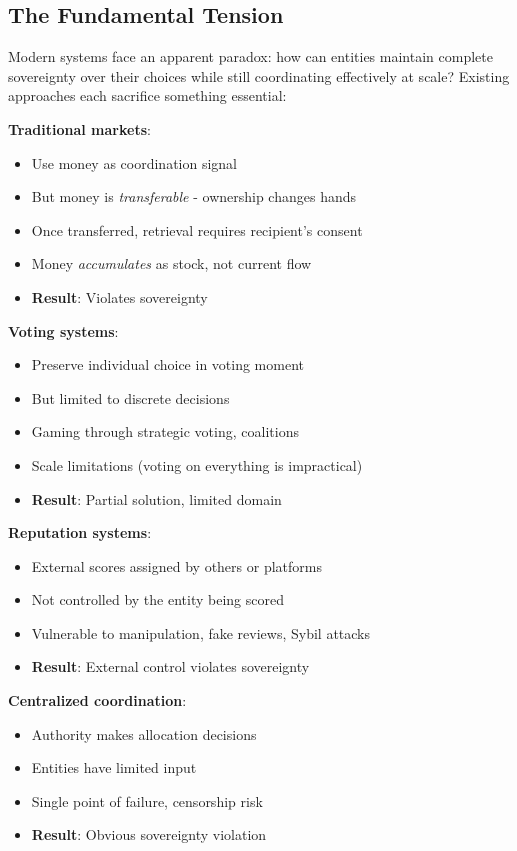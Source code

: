 \documentclass[11pt,a4paper]{article}
\theoremstyle{definition}
\theoremstyle{remark}
\begin{document}
\subsection{The Fundamental Tension}

Modern systems face an apparent paradox: how can entities maintain complete sovereignty over their choices while still coordinating effectively at scale? Existing approaches each sacrifice something essential:

\textbf{Traditional markets}:
\begin{itemize}
\item Use money as coordination signal
\item But money is \textit{transferable} - ownership changes hands
\item Once transferred, retrieval requires recipient's consent
\item Money \textit{accumulates} as stock, not current flow
\item \textbf{Result}: Violates sovereignty
\end{itemize}

\textbf{Voting systems}:
\begin{itemize}
\item Preserve individual choice in voting moment
\item But limited to discrete decisions
\item Gaming through strategic voting, coalitions
\item Scale limitations (voting on everything is impractical)
\item \textbf{Result}: Partial solution, limited domain
\end{itemize}

\textbf{Reputation systems}:
\begin{itemize}
\item External scores assigned by others or platforms
\item Not controlled by the entity being scored
\item Vulnerable to manipulation, fake reviews, Sybil attacks
\item \textbf{Result}: External control violates sovereignty
\end{itemize}

\textbf{Centralized coordination}:
\begin{itemize}
\item Authority makes allocation decisions
\item Entities have limited input
\item Single point of failure, censorship risk
\item \textbf{Result}: Obvious sovereignty violation
\end{itemize}
\end{document}

